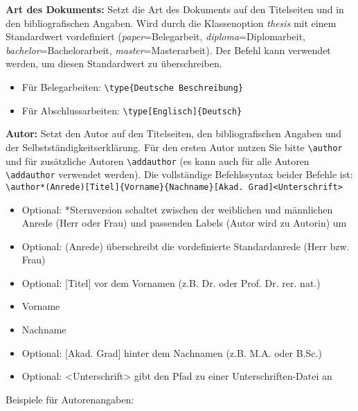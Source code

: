 \documentclass[
%
	thesis=paper,		%
	compactlistof,		%
	noauthorship,		%
%
	fancy,				%
%
%
]{hsmw-thesis}
\begin{document}
	
	\textbf{Art des Dokuments:}\label{cmd:type}
	Setzt die Art des Dokuments auf den Titelseiten und in den bibliografischen Angaben.
	Wird durch die Klassenoption \textit{thesis} mit einem Standardwert vordefiniert (\textit{paper}=Belegarbeit, \textit{diploma}=Diplomarbeit, \textit{bachelor}=Bachelorarbeit, \textit{master}=Masterarbeit).
	Der Befehl kann verwendet werden, um diesen Standardwert zu überschreiben.
	\begin{itemize}
		\item Für Belegarbeiten: \verb|\type{Deutsche Beschreibung}|
		\item Für Abschlussarbeiten: \verb|\type[Englisch]{Deutsch}|
	\end{itemize}
	
	\textbf{Autor:}\label{cmd:author}
	Setzt den Autor auf den Titelseiten, den bibliografischen Angaben und der Selbstständigkeitserklärung.
	Für den ersten Autor nutzen Sie bitte \verb|\author| und für zusätzliche Autoren \verb|\addauthor| (es kann auch für alle Autoren \verb|\addauthor| verwendet werden).
	Die vollständige Befehlssyntax beider Befehle ist:
	\newline
	\verb|\author*(Anrede)[Titel]{Vorname}{Nachname}[Akad. Grad]<Unterschrift>|
	\begin{itemize}
		\item Optional: *Sternversion schaltet zwischen der weiblichen und männlichen Anrede (Herr oder Frau) und passenden Labels (Autor wird zu Autorin) um
		\item Optional: (Anrede) überschreibt die vordefinierte Standardanrede (Herr bzw. Frau)
		\item Optional: [Titel] vor dem Vornamen (z.B. Dr. oder Prof. Dr. rer. nat.)
		\item Vorname
		\item Nachname
		\item Optional: [Akad. Grad] hinter dem Nachnamen (z.B. M.A. oder B.Sc.)
		\item Optional: <Unterschrift> gibt den Pfad zu einer Unterschriften-Datei an
	\end{itemize}\vspace*{-\baselineskip}
	Beispiele für Autorenangaben:
\end{document}
